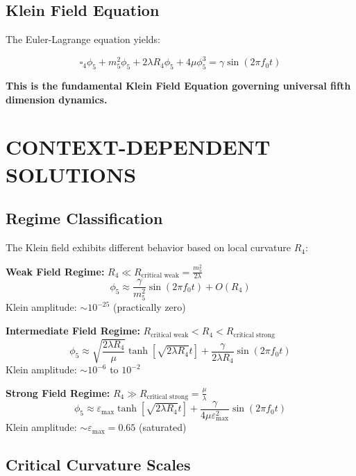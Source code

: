 \documentclass[12pt,a4paper]{article}
\begin{document}
\subsection{Klein Field Equation}

The Euler-Lagrange equation yields:

\begin{equation}
\boxed{
\square_4\phi_5 + m_5^2\phi_5 + 2\lambda R_4\phi_5 + 4\mu\phi_5^3 = \gamma \sin(2\pi f_0 t)
}
\end{equation}

\textbf{This is the fundamental Klein Field Equation governing universal fifth dimension dynamics.}

\section{CONTEXT-DEPENDENT SOLUTIONS}

\subsection{Regime Classification}

The Klein field exhibits different behavior based on local curvature $R_4$:

\textbf{Weak Field Regime:} $R_4 \ll R_{\text{critical weak}} = \frac{m_5^2}{2\lambda}$
\begin{equation}
\phi_5 \approx \frac{\gamma}{m_5^2} \sin(2\pi f_0 t) + O(R_4)
\end{equation}
Klein amplitude: $\sim 10^{-25}$ (practically zero)

\textbf{Intermediate Field Regime:} $R_{\text{critical weak}} < R_4 < R_{\text{critical strong}}$
\begin{equation}
\phi_5 \approx \sqrt{\frac{2\lambda R_4}{\mu}} \tanh[\sqrt{2\lambda R_4}t] + \frac{\gamma}{2\lambda R_4} \sin(2\pi f_0 t)
\end{equation}
Klein amplitude: $\sim 10^{-6}$ to $10^{-2}$

\textbf{Strong Field Regime:} $R_4 \gg R_{\text{critical strong}} = \frac{\mu}{\lambda}$
\begin{equation}
\phi_5 \approx \varepsilon_{\max} \tanh[\sqrt{2\lambda R_4}t] + \frac{\gamma}{4\mu\varepsilon_{\max}^2} \sin(2\pi f_0 t)
\end{equation}
Klein amplitude: $\sim \varepsilon_{\max} = 0.65$ (saturated)

\subsection{Critical Curvature Scales}
\end{document}
